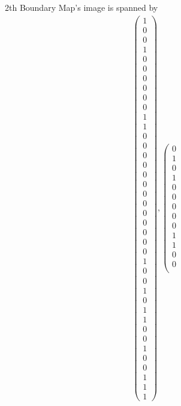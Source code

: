 \documentclass[8pt]{article}
\begin{document}
 2th Boundary Map's image is spanned by
 \begin{align*} \left(\begin{array}{r}
1 \\
0 \\
0 \\
1 \\
0 \\
0 \\
0 \\
0 \\
0 \\
0 \\
1 \\
1 \\
0 \\
0 \\
0 \\
0 \\
0 \\
0 \\
0 \\
0 \\
0 \\
0 \\
0 \\
0 \\
0 \\
1 \\
0 \\
0 \\
1 \\
0 \\
1 \\
1 \\
0 \\
0 \\
1 \\
0 \\
0 \\
1 \\
1 \\
1
\end{array}\right) ,
 \left(\begin{array}{r}
0 \\
1 \\
0 \\
1 \\
0 \\
0 \\
0 \\
0 \\
0 \\
1 \\
1 \\
0 \\
0 \\

\end{array}
\end{align*}
\end{document}

